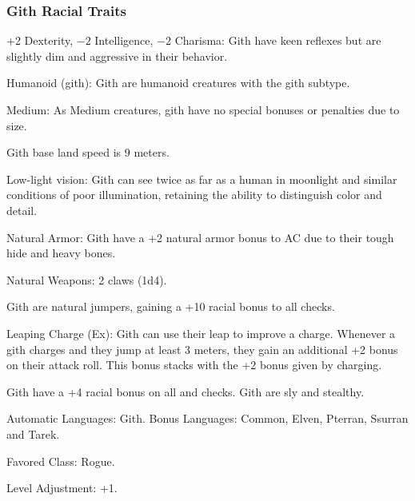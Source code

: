 \subsubsection{Gith Racial Traits}
\begin{itemize*}
    \item +2 Dexterity, $-2$ Intelligence, $-2$ Charisma: Gith have keen reflexes but are slightly dim and aggressive in their behavior.
    \item Humanoid (gith): Gith are humanoid creatures with the gith subtype.
    \item Medium: As Medium creatures, gith have no special bonuses or penalties due to size.
    \item Gith base land speed is 9 meters.
    \item Low-light vision: Gith can see twice as far as a human in moonlight and similar conditions of poor illumination, retaining the ability to distinguish color and detail.
    \item Natural Armor: Gith have a +2 natural armor bonus to AC due to their tough hide and heavy bones.
    \item Natural Weapons: 2 claws (1d4).
    \item Gith are natural jumpers, gaining a +10 racial bonus to all  checks.
    \item Leaping Charge (Ex): Gith can use their leap to improve a charge. Whenever a gith charges and they jump at least 3 meters, they gain an additional +2 bonus on their attack roll. This bonus stacks with the +2 bonus given by charging.
    \item Gith have a +4 racial bonus on all  and  checks. Gith are sly and stealthy.
    \item Automatic Languages: Gith. Bonus Languages: Common, Elven, Pterran, Ssurran and Tarek.
    \item Favored Class: Rogue.
    \item Level Adjustment: +1.
\end{itemize*}
